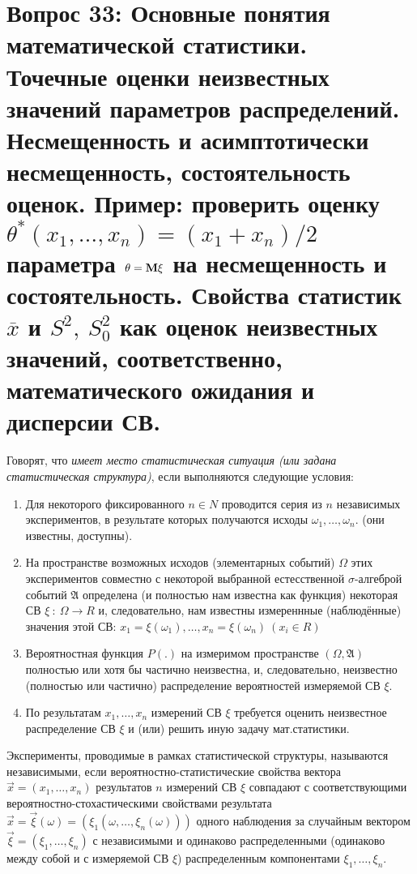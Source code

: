 \section{Вопрос 33:
Основные понятия математической статистики.
Точечные оценки неизвестных значений параметров распределений.
Несмещенность и асимптотически несмещенность, состоятельность оценок.
Пример: проверить оценку $\theta^*(x_1,\ldots,x_n) = (x_1+x_n)/2$ параметра $\theta=\bf{M}\xi$ на
несмещенность и состоятельность.
Свойства статистик $\overline{x}$ и $S^2, \ S_0^2$ как оценок неизвестных значений, соответственно,
математического ожидания и дисперсии СВ.
}

\begin{defs}
  Говорят, что \textit{имеет место статистическая ситуация (или задана статистическая структура)},
  если выполняются следующие условия:
  \begin{enumerate}
    \item Для некоторого фиксированного $n \in N$ проводится серия из $n$ независимых экспериментов,
    в результате которых получаются исходы $\omega_1,\ldots,\omega_n$. (они известны, доступны).
    \item На пространстве возможных исходов (элементарных событий) $\Omega$ этих
    экспериментов совместно с некоторой выбранной естесственной $\sigma$-алгеброй событий $\mathfrak{A}$
    определена (и полностью нам известна как функция) некоторая СВ $\xi \ : \ \Omega \to R$ и, следовательно,
    нам известны измереннные (наблюдённые) значения этой СВ: $x_1=\xi(\omega_1),\ldots,x_n=\xi(\omega_n) \ (x_i \in R)$
    \item Вероятностная функция $P(.)$ на измеримом пространстве $(\Omega, \mathfrak{A})$ полностью или хотя бы частично
    неизвестна, и, следовательно, неизвестно (полностью или частично) распределение вероятностей измеряемой СВ $\xi$.
    \item По результатам $x_1,\ldots,x_n$ измерений СВ $\xi$ требуется оценить неизвестное распределение СВ $\xi$
    и (или) решить иную задачу мат.статистики.
  \end{enumerate}
\end{defs}

\begin{defs}
  Эксперименты, проводимые в рамках статистической структуры, называются независимыми,
  если вероятностно-статистические свойства вектора $\overrightarrow{x}=(x_1,\ldots,x_n)$ результатов
  $n$ измерений СВ $\xi$ совпадают с соответствующими вероятностно-стохастическими свойствами результата
  $\overrightarrow{x} = \overrightarrow{\xi}(\omega)=(\xi_1(\omega, \ldots, \xi_n(\omega)))$ одного наблюдения за
  случайным вектором $\overrightarrow{\xi}=(\xi_1,\ldots,\xi_n)$ с независимыми и одинаково распределенными
  (одинаково между собой и с измеряемой СВ $\xi$) распределенным компонентами $\xi_1,\ldots,\xi_n$.
\end{defs}

